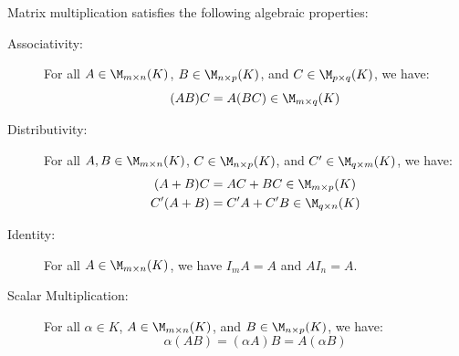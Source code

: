 \begin{proposition} 
\label{prop:matrix_multiplication_properties}
Matrix multiplication satisfies the following algebraic properties:
\begin{description}
    \item[Associativity:] For all $A \in \M_{m \times n}(K)$, $B \in \M_{n \times p}(K)$, and $C \in \M_{p \times q}(K)$, we have:
    \begin{equation*}
        (AB)C = A(BC) \in \M_{m \times q}(K)
    \end{equation*}
    \item[Distributivity:] For all $A, B \in \M_{m \times n}(K)$, $C \in \M_{n \times p}(K)$, and $C' \in \M_{q \times m}(K)$, we have:
    \begin{align*}
        (A + B)C &= AC + BC \in \M_{m \times p}(K) \\
        C'(A + B) &= C'A + C'B \in \M_{q \times n}(K)
    \end{align*}
    \item[Identity:] For all $A \in \M_{m \times n}(K)$, we have $I_m A = A$ and $A I_n = A$.
    \item[Scalar Multiplication:] For all $\alpha \in K$, $A \in \M_{m \times n}(K)$, and $B \in \M_{n \times p}(K)$, we have:
    \begin{equation*}
        \alpha(AB) = (\alpha A)B = A(\alpha B)
    \end{equation*}
\end{description}
\end{proposition}

